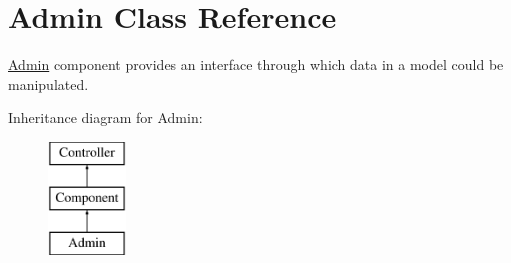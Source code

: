 \hypertarget{class_admin}{
\section{Admin Class Reference}
\label{class_admin}
}


\hyperlink{class_admin}{Admin} component provides an interface through which data in a model could be manipulated.  


Inheritance diagram for Admin:\begin{figure}[H]
\begin{center}
\leavevmode
\includegraphics[height=3.000000cm]{class_admin}
\end{center}
\end{figure}
